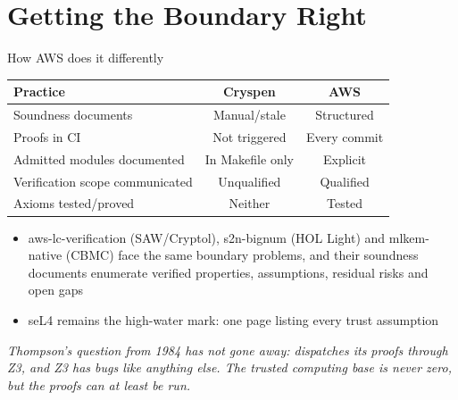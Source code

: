 \ifdefined\PRESENTATION\else\PassOptionsToClass{handout}{beamer}\fi\documentclass[aspectratio=169, lualatex]{beamer}
\begin{document}
\section{Getting the Boundary Right}

\begin{frame}{How AWS does it differently}
	\footnotesize
	\begin{center}
		\small
		\begin{tabular}{|l|c|c|}
			\hline
			\textbf{Practice}               & \textbf{Cryspen} & \textbf{AWS} \\
			\hline
			Soundness documents             & Manual/stale     & Structured   \\
			\hline
			Proofs in CI                    & Not triggered    & Every commit \\
			\hline
			Admitted modules documented     & In Makefile only & Explicit     \\
			\hline
			Verification scope communicated & Unqualified      & Qualified    \\
			\hline
			Axioms tested/proved            & Neither          & Tested       \\
			\hline
		\end{tabular}
	\end{center}
	\vspace{0.4em}
	\begin{itemize}
		\item aws-lc-verification (SAW/Cryptol), s2n-bignum (HOL Light) and mlkem-native (CBMC) face the same boundary problems, and their soundness documents enumerate verified properties, assumptions, residual risks and open gaps
		\item seL4 remains the high-water mark: one page listing every trust assumption
	\end{itemize}
	\vspace{0.2em}
	\begin{center}
		\scriptsize
		\textit{Thompson's question from 1984 has not gone away: \fstar dispatches its proofs through Z3, and Z3 has bugs like anything else. The trusted computing base is never zero, but the proofs can at least be run.}
	\end{center}
\end{frame}
\end{document}
